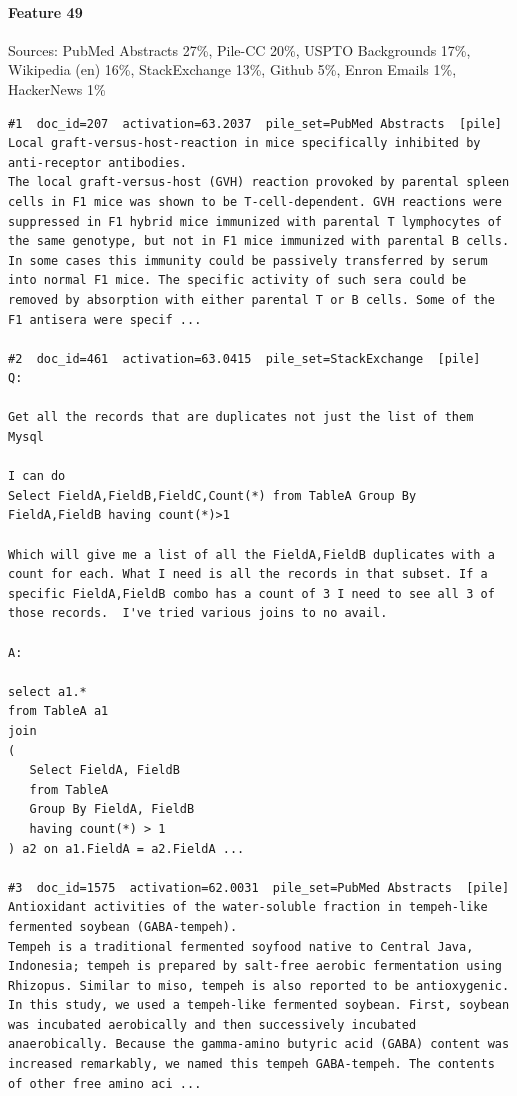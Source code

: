 \paragraph*{Feature 49} Sources: PubMed Abstracts 27\%, Pile-CC 20\%, USPTO Backgrounds 17\%, Wikipedia (en) 16\%, StackExchange 13\%, Github 5\%, Enron Emails 1\%, HackerNews 1\%

\begin{verbatim}
#1  doc_id=207  activation=63.2037  pile_set=PubMed Abstracts  [pile]
Local graft-versus-host-reaction in mice specifically inhibited by anti-receptor antibodies.
The local graft-versus-host (GVH) reaction provoked by parental spleen cells in F1 mice was shown to be T-cell-dependent. GVH reactions were suppressed in F1 hybrid mice immunized with parental T lymphocytes of the same genotype, but not in F1 mice immunized with parental B cells. In some cases this immunity could be passively transferred by serum into normal F1 mice. The specific activity of such sera could be removed by absorption with either parental T or B cells. Some of the F1 antisera were specif ...

#2  doc_id=461  activation=63.0415  pile_set=StackExchange  [pile]
Q:

Get all the records that are duplicates not just the list of them Mysql

I can do
Select FieldA,FieldB,FieldC,Count(*) from TableA Group By FieldA,FieldB having count(*)>1

Which will give me a list of all the FieldA,FieldB duplicates with a count for each. What I need is all the records in that subset. If a specific FieldA,FieldB combo has a count of 3 I need to see all 3 of those records.  I've tried various joins to no avail.

A:

select a1.* 
from TableA a1
join
(
   Select FieldA, FieldB
   from TableA 
   Group By FieldA, FieldB 
   having count(*) > 1
) a2 on a1.FieldA = a2.FieldA ...

#3  doc_id=1575  activation=62.0031  pile_set=PubMed Abstracts  [pile]
Antioxidant activities of the water-soluble fraction in tempeh-like fermented soybean (GABA-tempeh).
Tempeh is a traditional fermented soyfood native to Central Java, Indonesia; tempeh is prepared by salt-free aerobic fermentation using Rhizopus. Similar to miso, tempeh is also reported to be antioxygenic. In this study, we used a tempeh-like fermented soybean. First, soybean was incubated aerobically and then successively incubated anaerobically. Because the gamma-amino butyric acid (GABA) content was increased remarkably, we named this tempeh GABA-tempeh. The contents of other free amino aci ...


\end{verbatim}
